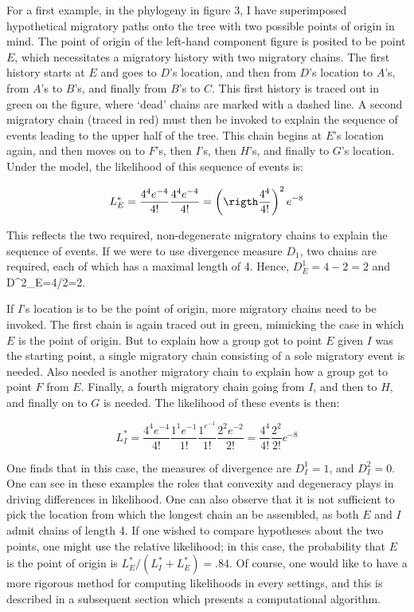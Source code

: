 \documentclass[11pt]{article}
\begin{document}
For a first example, in the phylogeny in figure 3, I have superimposed hypothetical migratory paths{} onto the tree with two possible points of origin in mind. The point of origin of the left-hand component figure is posited to be point $E$, which necessitates a migratory history with two migratory chains.  The first history starts at $E$ and goes to $D$'s location, and then from $D$'s location to $A$'s, from $A$'s to $B$'s, and finally from $B$'s to $C$. This first history is traced out in green on the figure, where `dead' chains are marked with a dashed line. A second migratory chain (traced in red) must then be invoked to explain the sequence of events leading to the upper half of the tree. This chain begins at $E$'s location again, and then moves on to $F$'s, then $I$'s, then $H$'s, and finally to $G$'s location. Under the model, the likelihood of this sequence of events is:

\begin{equation*}
L^*_E =  \frac{4^4e^{-4}}{4!}\frac{4^4e^{-4}}{4!} =\left(\rigth\frac{4^4}{4!}\right)^2e^{-8}
\end{equation*}

This reflects the two required, non-degenerate migratory chains to explain the sequence of events.  If we were to use divergence measure $D_1$, two chains are required, each of which has a maximal length of 4. Hence, $D^1_E=4-2=2$ and D^2_E=4/2=2.

If $I$'s location is  to be the point of origin, more migratory chains need to be invoked. The first chain is again traced out in green, mimicking the case in which $E$ is the point of origin. But to explain how a group got to point $E$ given $I$ was the starting point, a single migratory chain consisting of a sole migratory event is needed. Also needed is another migratory chain to explain how a group got to point $F$ from $E$. Finally, a fourth migratory chain going from $I$, and then to $H$, and finally on to $G$ is needed. The likelihood of these events is then:

\begin{equation*}
L^*_I =\frac{4^4e^{-4}}{4!}\frac{1^1e^{-1}}{1!}\frac{1^e^{-1}}{1!}\frac{2^2e^{-2}}{2!}=\frac{4^4}{4!}\frac{2^2}{2!}e^{-8}
\end{equation*} 

One finds that in this case, the measures of divergence are $D_I^1=1$, and $D^2_I
=0$. One can see in these examples the roles that convexity and degeneracy plays in driving differences in likelihood. One can also observe that it is not sufficient to pick the location from which the longest chain an be assembled, as both $E$ and $I$ admit chains of length 4. 
If one wished to compare hypotheses about the two points, one might use the relative likelihood; in this case, the probability that $E$ is the point of origin is $L^*_E/(L^*_I+L^*_E)
=.84.$ Of course, one would like to have a more rigorous method for computing likelihoods in every settings, and this is described in a subsequent section which presents a computational algorithm.  
\end{document}
